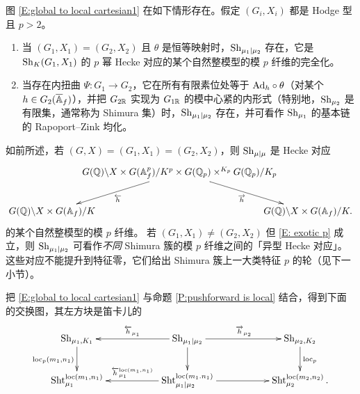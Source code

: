 \begin{thm}
\label{T: corr. Shimura}
图 \eqref{E:global to local cartesian1} 在如下情形存在。假定 $(G_i,X_i)$ 都是 Hodge 型且 $p>2$。
\begin{enumerate}
\item
当 $(G_1,X_1)=(G_2,X_2)$ 且 $\theta$ 是恒等映射时，$\operatorname{Sh}_{\mu_1\mid \mu_2}$ 存在，它是 $\operatorname{Sh}_K(G_1,X_1)$ 的 $p$ 幂 Hecke 对应的某个自然整模型的模 $p$ 纤维的完全化。
\item
当存在内扭曲 $\Psi: G_1\to G_2$，它在所有有限素位处等于 ${\operatorname{Ad}}_h \circ \theta$（对某个 $h\in G_2(\overline{{\mathbb A}}_f)$），并把 $G_{2{\mathbb R}}$ 实现为 $G_{1{\mathbb R}}$ 的模中心紧的内形式（特别地，$\operatorname{Sh}_{\mu_2}$ 是有限集，通常称为 Shimura 集）时，$\operatorname{Sh}_{\mu_1\mid \mu_2}$ 存在，并可看作 $\operatorname{Sh}_{\mu_1}$ 的基本链的 Rapoport–Zink 均化。
\end{enumerate}
\end{thm}

\begin{rmk}
如前所述，若 $(G,X)=(G_1,X_1)=(G_2,X_2)$，则 $\operatorname{Sh}_{\mu\mid\mu}$ 是 Hecke 对应
\begin{equation*}
\label{E: pHecke corr}
\xymatrix@C=-20pt{
&G(\bQ)\backslash X\times G(\bA_f^p)/K^p\times G(\bQ_p)\times^{K_p}G(\bQ_p)/K_p\ar^{\overleftarrow{h}}[ld]\ar_{\overrightarrow{h}}[rd]&\\
G(\bQ)\backslash X\times G(\bA_f)/K && G(\bQ)\backslash X\times G(\bA_f)/K.}
\end{equation*}
的某个自然整模型的模 $p$ 纤维。
若 $(G_1,X_1)\neq (G_2,X_2)$ 但 \eqref{E: exotic p} 成立，则 $\operatorname{Sh}_{\mu_1\mid \mu_2}$ 可看作\emph{不同} Shimura 簇的模 $p$ 纤维之间的「异型 Hecke 对应」。这些对应不能提升到特征零，它们给出 Shimura 簇上一大类特征 $p$ 的轮（见下一小节）。
\end{rmk}

把 \eqref{E:global to local cartesian1} 与命题 \ref{P:pushforward is local} 结合，得到下面的交换图，其左方块是笛卡儿的
\[
\xymatrix{
\Sh_{\mu_1,K_1} \ar_{\loc_p(m_1,n_1)}[d] && \ar_{\overleftarrow{h}_{\mu_1}}[ll] \Sh_{\mu_1|\mu_2} \ar^{\overrightarrow{h}_{\mu_2}}[rr] \ar[d] && \Sh_{\mu_2,K_2} \ar^{\loc_p}[d] \\
\Sht_{\mu_1}^{\loc(m_1,n_1)} && \ar_{\overleftarrow{h}_{\mu_1}^{\loc(m_1,n_1)}}[ll] \Sht_{\mu_1|\mu_2}^{\loc(m_1.n_1)} \ar[rr]&& \Sht_{\mu_2}^{\loc(m_2,n_2)}.
}
\]

